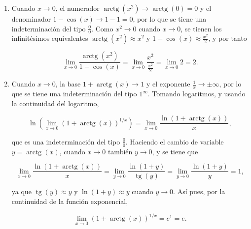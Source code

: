 \documentclass[
  spanish,
  a4paper,
]{scrreport}
\theoremstyle{definition}
\theoremstyle{remark}
\begin{document}
\begin{tcolorbox}[enhanced jigsaw, arc=.35mm, bottomrule=.15mm, bottomtitle=1mm, breakable, colback=white, colbacktitle=quarto-callout-tip-color!10!white, colframe=quarto-callout-tip-color-frame, coltitle=black, left=2mm, leftrule=.75mm, opacityback=0, opacitybacktitle=0.6, rightrule=.15mm, title=\textcolor{quarto-callout-tip-color}{\faLightbulb}\hspace{0.5em}{Solución}, titlerule=0mm, toprule=.15mm, toptitle=1mm]

\begin{enumerate}
\def\labelenumi{\alph{enumi}.}
\item
  Cuando \(x\to 0\), el numerador
  \(\operatorname{arctg}(x^2)\to \operatorname{arctg}(0) = 0\) y el
  denominador \(1-\cos(x)\to 1-1 = 0\), por lo que se tiene una
  indeterminación del tipo \(\frac{0}{0}\). Como \(x^2\to 0\) cuando
  \(x\to 0\), se tienen los infinitésimos equivalentes
  \(\operatorname{arctg}(x^2)\approx x^2\) y
  \(1-\cos(x)\approx \frac{x^2}{2}\), y por tanto

  \[
  \lim_{x\to 0}\frac{\operatorname{arctg}(x^2)}{1-\cos(x)} = \lim_{x\to 0}\frac{x^2}{\frac{x^2}{2}} = \lim_{x\to 0} 2 = 2.
  \]
\item
  Cuando \(x\to 0\), la base \(1+\operatorname{arctg}(x)\to 1\) y el
  exponente \(\frac{1}{x}\to\pm\infty\), por lo que se tiene una
  indeterminación del tipo \(1^\infty\). Tomando logaritmos, y usando la
  continuidad del logaritmo,

  \[
  \ln\left(\lim_{x\to 0}\left(1+\operatorname{arctg}(x)\right)^{1/x}\right) = \lim_{x\to 0}\frac{\ln\left(1+\operatorname{arctg}(x)\right)}{x},
  \]

  que es una indeterminación del tipo \(\frac{0}{0}\). Haciendo el
  cambio de variable \(y = \operatorname{arctg}(x)\), cuando \(x\to 0\)
  también \(y\to 0\), y se tiene que

  \[
  \lim_{x\to 0}\frac{\ln\left(1+\operatorname{arctg}(x)\right)}{x} 
  = \lim_{y\to 0}\frac{\ln(1+y)}{\operatorname{tg}(y)} 
  = \lim_{y\to 0}\frac{\ln(1+y)}{y}
  = 1,
  \]

  ya que \(\operatorname{tg}(y)\approx y\) y \(\ln(1+y) \approx y\)
  cuando \(y\to 0\). Así pues, por la continuidad de la función
  exponencial,

  \[
  \lim_{x\to 0}\left(1+\operatorname{arctg}(x)\right)^{1/x} = e^1 = e.
  \]
\end{enumerate}

\end{tcolorbox}
\end{document}

